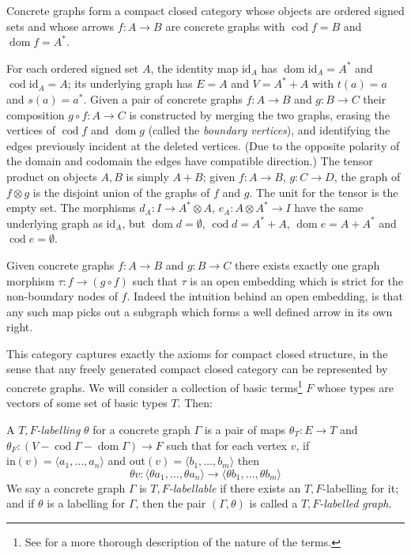 \documentclass[runningheads]{llncs}
\newcommand{\dom}{\operatorname{dom}}
\newcommand{\cod}{\operatorname{cod}}
\newcommand{\id}[1]{\ensuremath{\mathrm{id}_{#1}}}
\begin{document}
\begin{proposition}
Concrete graphs form a compact closed category whose objects are
ordered signed sets and whose arrows $f:A\to B$ are concrete graphs with
$\cod f = B$  and $\dom f = A^*$.
\end{proposition}
For each ordered signed set $A$, the identity map $\id{A}$ has $\dom
\id{A} = A^*$ and $\cod \id{A} = A$; its underlying graph has $E = A$
and $V = A^* + A$ with $t(a) = a$ and $s(a) = a^*$.  Given a pair of
concrete graphs $f:A\to B$ and $g:B\to C$ their composition $g\circ
f:A\to C$ is constructed by merging the two graphs, erasing the
vertices of $\cod f$ and $\dom g$ (called the \emph{boundary
  vertices}), and identifying the edges previously incident at the
deleted vertices.  (Due to the opposite polarity of the domain and
codomain the edges have compatible direction.)  The tensor product on
objects $A,B$ is simply $A+B$; given $f:A\to B$, $g: C\to D$, the
graph of $f \otimes g$ is the disjoint union of the graphs of $f$ and
$g$.  The unit for the tensor is the empty set.  The morphisms $d_A :
I \to A^* \otimes A$, $e_A : A \otimes A^* \to I$ have the same
underlying graph as $\id{A}$, but $\dom d = \emptyset$, $\cod d = A^*+A$, $\dom e
= A+A^*$ and $\cod e = \emptyset$.

\begin{remark}
  Given concrete graphs $f : A\to B$ and $g:B\to C$ there exists
  exactly one graph morphism  $\tau:  f \to (g\circ f)$ such that
  $\tau$ is an open embedding which is strict for the non-boundary nodes
  of $f$. Indeed the intuition behind an open embedding, is that any
  such map picks out a subgraph which forms a well defined arrow in
  its own right.
\end{remark}

This category captures exactly the axioms for compact closed
structure, in the sense that any freely generated compact closed
category can be represented by concrete graphs.  We will consider
a collection of basic terms\footnote{See \cite{Duncan:thesis:2006} for
  a more thorough description of the nature of the terms.} $F$
whose types are vectors of some set of basic types $T$.  Then:

\begin{definition}
  A \emph{$T,F$-labelling} $\theta$ for a concrete graph $\Gamma$ is a pair of
  maps  $\theta_T : E \to T$ and $\theta_F : (V - \cod\Gamma -
  \dom\Gamma) \to F$  such that for each vertex  $v$, if
  $\text{in}(v) = \langle a_1, \ldots, a_n\rangle$ and $\text{out}(v)
  = \langle b_1, \ldots, b_m\rangle$ then 
  \[
  \theta v : \langle \theta a_1, \ldots, \theta a_n \rangle
  \to 
  \langle \theta b_1, \ldots, \theta b_m \rangle
  \]
  We say a concrete graph $\Gamma$ is \emph{$T,F$-labellable} if there exists an 
  $T,F$-labelling for it; and if $\theta$ is a labelling for $\Gamma$, then
 the pair $(\Gamma,\theta)$ is called a \emph{$T,F$-labelled graph}.
\end{definition}
\end{document}

